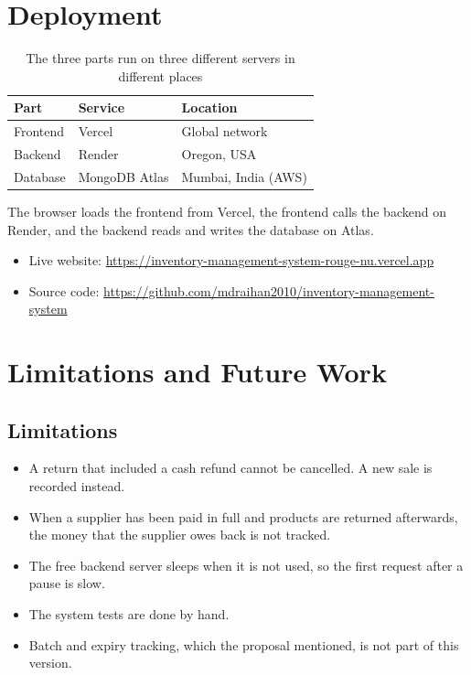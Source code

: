 \documentclass[11pt,a4paper]{article}
\begin{document}
\section{Deployment}
\begin{table}[H]
\centering
\begin{tabularx}{\textwidth}{@{}P{2.4cm}P{3cm}Y@{}}
\toprule
\textbf{Part} & \textbf{Service} & \textbf{Location} \\
\midrule
Frontend & Vercel & Global network \\
Backend & Render & Oregon, USA \\
Database & MongoDB Atlas & Mumbai, India (AWS) \\
\bottomrule
\end{tabularx}
\caption{The three parts run on three different servers in different places}
\end{table}
The browser loads the frontend from Vercel, the frontend calls the backend on Render, and the backend reads and writes the database on Atlas.
\begin{itemize}
  \item Live website: \url{https://inventory-management-system-rouge-nu.vercel.app}
  \item Source code: \url{https://github.com/mdraihan2010/inventory-management-system}
\end{itemize}

\section{Limitations and Future Work}
\subsection{Limitations}
\begin{itemize}
  \item A return that included a cash refund cannot be cancelled. A new sale is recorded instead.
  \item When a supplier has been paid in full and products are returned afterwards, the money that the supplier owes back is not tracked.
  \item The free backend server sleeps when it is not used, so the first request after a pause is slow.
  \item The system tests are done by hand.
  \item Batch and expiry tracking, which the proposal mentioned, is not part of this version.
\end{itemize}
\end{document}
